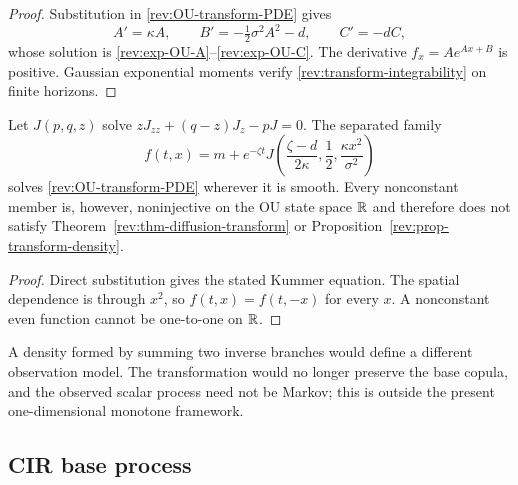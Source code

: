 \begin{proof}
Substitution in \eqref{rev:OU-transform-PDE} gives
\[
A'=\kappa A,\qquad B'=-\tfrac12\sigma^2A^2-d,
\qquad C'=-dC,
\]
whose solution is \eqref{rev:exp-OU-A}--\eqref{rev:exp-OU-C}.  The derivative
$f_x=Ae^{Ax+B}$ is positive.  Gaussian exponential moments verify
\eqref{rev:transform-integrability} on finite horizons.
\end{proof}

\begin{proposition}
\label{rev:prop-OU-Kummer-failure}
Let $J(p,q,z)$ solve
$zJ_{zz}+(q-z)J_z-pJ=0$.  The separated family
\begin{equation}
f(t,x)=m+e^{-\zeta t}
J\!\left(\frac{\zeta-d}{2\kappa},\frac12,
         \frac{\kappa x^2}{\sigma^2}\right)
\label{rev:OU-Kummer}
\end{equation}
solves \eqref{rev:OU-transform-PDE} wherever it is smooth.  Every nonconstant
member is, however, noninjective on the OU state space $\mathbb R$ and therefore does
not satisfy Theorem~\ref{rev:thm-diffusion-transform} or
Proposition~\ref{rev:prop-transform-density}.
\end{proposition}

\begin{proof}
Direct substitution gives the stated Kummer equation.  The spatial dependence
is through $x^2$, so $f(t,x)=f(t,-x)$ for every $x$.  A nonconstant even function
cannot be one-to-one on $\mathbb R$.
\end{proof}

\begin{remark}
A density formed by summing two inverse branches would define a different
observation model.  The transformation would no longer preserve the base
copula, and the observed scalar process need not be Markov; this is outside the
present one-dimensional monotone framework.
\end{remark}

\subsection{CIR base process}

